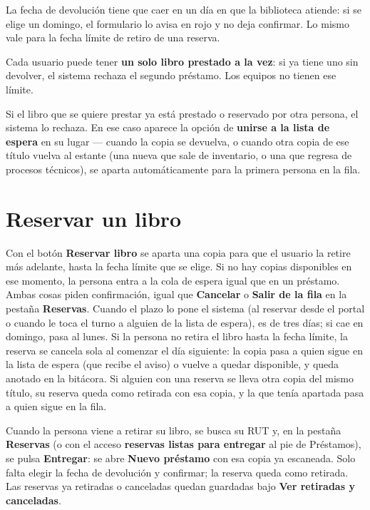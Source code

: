 \documentclass[11pt,a4paper]{report}
\begin{document}
\begin{nota}
La fecha de devolución tiene que caer en un día en que la biblioteca
atiende: si se elige un domingo, el formulario lo avisa en rojo y no deja
confirmar. Lo mismo vale para la fecha límite de retiro de una reserva.
\end{nota}

\begin{importante}
Cada usuario puede tener \textbf{un solo libro prestado a la vez}: si ya
tiene uno sin devolver, el sistema rechaza el segundo préstamo. Los
equipos no tienen ese límite.
\end{importante}

\begin{importante}
Si el libro que se quiere prestar ya está prestado o reservado por otra
persona, el sistema lo rechaza. En ese caso aparece la opción de
\textbf{unirse a la lista de espera} en su lugar --- cuando la copia se
devuelva, o cuando otra copia de ese título vuelva al estante (una nueva que
sale de inventario, o una que regresa de procesos técnicos), se aparta
automáticamente para la primera persona en la fila.
\end{importante}

\section{Reservar un libro}

Con el botón \textbf{Reservar libro} se aparta una copia para que el
usuario la retire más adelante, hasta la fecha límite que se elige. Si no
hay copias disponibles en ese momento, la persona entra a la cola de
espera igual que en un préstamo. Ambas cosas piden confirmación, igual que
\textbf{Cancelar} o \textbf{Salir de la fila} en la pestaña
\textbf{Reservas}. Cuando el plazo lo pone el sistema (al reservar desde
el portal o cuando le toca el turno a alguien de la lista de espera), es
de tres días; si cae en domingo, pasa al lunes. Si la persona no retira el
libro hasta la fecha límite, la reserva se cancela sola al comenzar el día
siguiente: la copia pasa a quien sigue en la lista de espera (que recibe el
aviso) o vuelve a quedar disponible, y queda anotado en la bitácora. Si
alguien con una reserva se lleva otra copia del mismo título, su reserva
queda como retirada con esa copia, y la que tenía apartada pasa a quien
sigue en la fila.

Cuando la persona viene a retirar su libro, se busca su RUT y, en la
pestaña \textbf{Reservas} (o con el acceso \textbf{reservas listas para
entregar} al pie de Préstamos), se pulsa \textbf{Entregar}: se abre
\textbf{Nuevo préstamo} con esa copia ya escaneada. Solo falta elegir la
fecha de devolución y confirmar; la reserva queda como retirada. Las
reservas ya retiradas o canceladas quedan guardadas bajo \textbf{Ver
retiradas y canceladas}.
\end{document}
